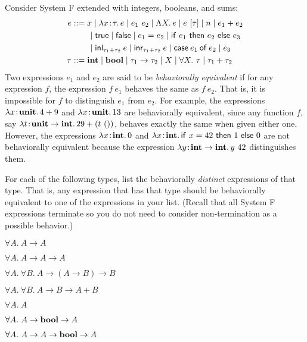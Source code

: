 \documentclass[10pt]{article}
\begin{document}
\begin{exercise}
Consider System F extended with integers, booleans, and sums:
\begin{align*}
e    &::= x \mid \lam{x\ty\tau}{e} \mid e_1~e_2 \mid \Lam{X}{e} \mid e~[\tau] \mid n \mid e_1 + e_2  \\
     & \qquad \mid \lamfnt{true}  \mid \lamfnt{false} \mid e_1 = e_2 \mid \cond[\lamfnt]{e_1}{e_2}{e_3}  \\
     & \qquad \mid \inleft{\tau_1}{\tau_2}{e} \mid \inright{\tau_1}{\tau_2}{e} \mid \sumcase{e_1}{e_2}{e_3}\\
\tau &::= \typ{int} \mid \typ{bool} \mid \tau_1 \arrow \tau_2 \mid X \mid \forall X.~\tau \mid \tau_1 + \tau_2
\end{align*}
%
Two expressions $e_1$ and $e_2$ are said to be \emph{behaviorally
equivalent} if for any expression $f$, the expression $f~e_1$ behaves
the same as $f~e_2$. That is, it is impossible for $f$ to distinguish
$e_1$ from $e_2$. For example, the expressions
$\lam{x\ty\typ{unit}}{4+9}$ and $\lam{x\ty\typ{unit}}{13}$ are
behaviorally equivalent, since any function $f$, say
$\lam{t\ty\typ{unit}\arrow\typ{int}}{29+(t~())}$, behaves exactly the
same when given either one. However, the expressions
$\lam{x\ty\typ{int}}{0}$ and
$\lam{x\ty\typ{int}}{\cond[\lamfnt]{x=42}{1}{0}}$ are not behaviorally
equivalent because the expression
$\lam{y\ty{\typ{int}\arrow\typ{int}}}{y~42}$ distinguishes them.

For each of the following types, list the behaviorally \emph{distinct}
expressions of that type. That is, any expression that has that type
should be behaviorally equivalent to one of the expressions in your
list.  (Recall that all System F expressions terminate so you do not
need to consider non-termination as a possible behavior.)
%
\begin{enumerate}
\begin{minipage}{.5\textwidth}
\item $\forall A.~ A \rightarrow A$\\
\item $\forall A.~ A \rightarrow A \rightarrow A$\\
\item $\forall A.~\forall B.~ A \rightarrow (A \rightarrow B) \rightarrow B$\\
\item $\forall A.~\forall B.~ A \rightarrow B \rightarrow A + B$\\
\end{minipage}\begin{minipage}{.5\textwidth}
\item $\forall A.~ A$\\
\item $\forall A.~ A \rightarrow \typ{bool} \rightarrow A$\\
\item $\forall A.~ A \rightarrow A \rightarrow \typ{bool} \rightarrow A$\\
\bigskip\bigskip
\end{minipage}
\end{enumerate}
\end{exercise}
\end{document}
